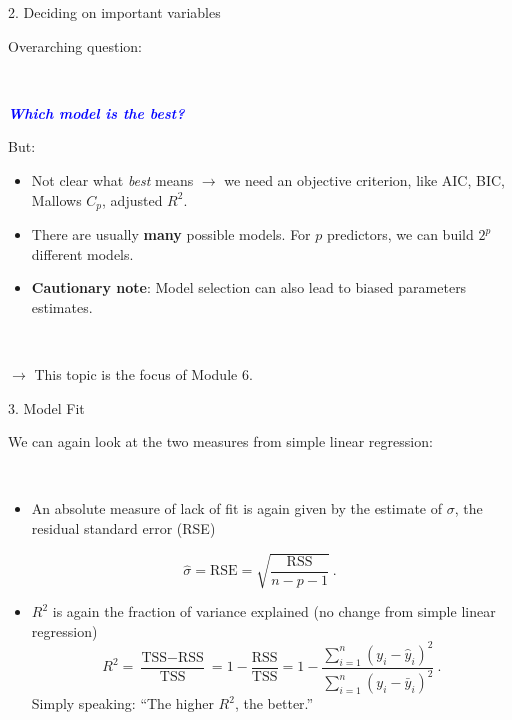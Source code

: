 \documentclass[
  10pt,
  ignorenonframetext,
]{beamer}
\providecommand{\tightlist}{%
  \setlength{\itemsep}{0pt}\setlength{\parskip}{0pt}}
\begin{document}
\begin{frame}
\begin{block}{2. Deciding on important variables}
\protect\hypertarget{deciding-on-important-variables}{}
\(~\)

Overarching question:

\(~\)

\begin{center}
 \emph{\textcolor{blue}{\bf Which model is the best?}}
\end{center}

\vspace{2mm}

But:

\begin{itemize}
\item
  Not clear what \emph{best} means \(\rightarrow\) we need an objective
  criterion, like AIC, BIC, Mallows \(C_p\), adjusted \(R^2\).
\item
  There are usually \textbf{many} possible models. For \(p\) predictors,
  we can build \(2^p\) different models.
\item
  \textbf{Cautionary note}: Model selection can also lead to biased
  parameters estimates.
\end{itemize}

\(~\)

\(\rightarrow\) This topic is the focus of Module 6.
\end{block}
\end{frame}

\begin{frame}
\begin{block}{3. Model Fit}
\protect\hypertarget{model-fit}{}
\(~\)

We can again look at the two measures from simple linear regression:

\(~\)

\begin{itemize}
\tightlist
\item
  An absolute measure of lack of fit is again given by the estimate of
  \(\sigma\), the residual standard error (RSE)
\end{itemize}

\[\hat\sigma = \text{RSE}= \sqrt{ \frac{ \text{RSS}}{n-p-1}} \ . \]

\begin{itemize}
\tightlist
\item
  \(R^2\) is again the fraction of variance explained (no change from
  simple linear regression)
  \[R^2 = \frac{\text{TSS}-\text{RSS}}{\text{TSS}}= 1-\frac{\text{RSS}}{\text{TSS}}=1-\frac{\sum_{i=1}^n(y_i-\hat{y}_i)^2}{\sum_{i=1}^n(y_i-\bar{y}_i)^2} \ .\]
  Simply speaking: ``The higher \(R^2\), the better.''
\end{itemize}
\end{block}
\end{frame}
\end{document}
